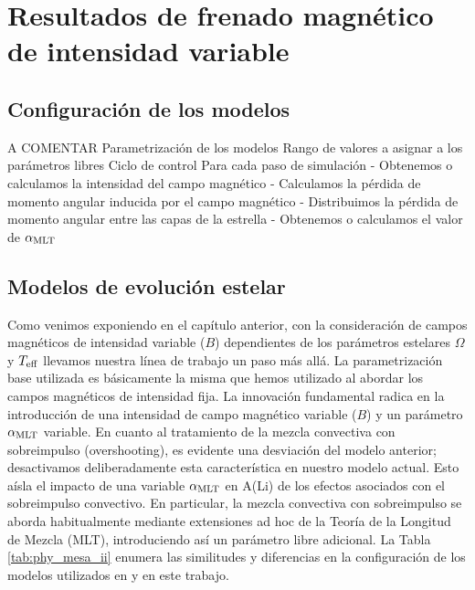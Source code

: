 

\chapter{Resultados de frenado magnético de intensidad variable}\label{ch:septimo-capitulo}
\section{Configuración de los modelos} \label{marco_teorico_ii}

A COMENTAR
Parametrización de los modelos
Rango de valores a asignar a los parámetros libres
Ciclo de control
Para cada paso de simulación
- Obtenemos o calculamos la intensidad del campo magnético
- Calculamos la pérdida de momento angular inducida por el campo magnético
- Distribuimos la pérdida de momento angular entre las capas de la estrella
- Obtenemos o calculamos el valor de $\alpha_{\mathrm{MLT}}$


\section{Modelos de evolución estelar}
Como venimos exponiendo en el capítulo anterior, con la consideración de campos magnéticos de intensidad variable ($B$) dependientes de los parámetros estelares $\Omega$ y $T_{\mathrm{eff}}$ llevamos nuestra línea de trabajo un paso más allá. La parametrización base utilizada es básicamente la misma que hemos utilizado al abordar los campos magnéticos de intensidad fija. La innovación fundamental radica en la introducción de una intensidad de campo magnético variable ($B$) y un parámetro $\alpha_{\mathrm{MLT}}$ variable. En cuanto al tratamiento de la mezcla convectiva con sobreimpulso (overshooting), es evidente una desviación del modelo anterior; desactivamos deliberadamente esta característica en nuestro modelo actual. Esto aísla el impacto de una variable $\alpha_{\mathrm{MLT}}$ en A(Li) de los efectos asociados con el sobreimpulso convectivo. En particular, la mezcla convectiva con sobreimpulso se aborda habitualmente mediante extensiones ad hoc de la Teoría de la Longitud de Mezcla (MLT), introduciendo así un parámetro libre adicional. La Tabla \ref{tab:phy_mesa_ii} enumera las similitudes y diferencias en la configuración de los modelos utilizados en \cite{Caballero2020} y en este trabajo.\par

